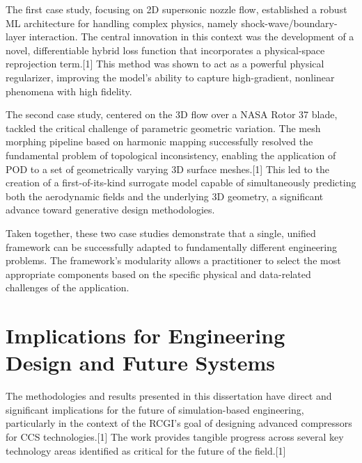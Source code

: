 \documentclass[12pt, a4paper]{report}
\begin{document}
The first case study, focusing on 2D supersonic nozzle flow, established a robust ML architecture for handling complex physics, namely shock-wave/boundary-layer interaction. The central innovation in this context was the development of a novel, differentiable hybrid loss function that incorporates a physical-space reprojection term.[1] This method was shown to act as a powerful physical regularizer, improving the model's ability to capture high-gradient, nonlinear phenomena with high fidelity.

The second case study, centered on the 3D flow over a NASA Rotor 37 blade, tackled the critical challenge of parametric geometric variation. The mesh morphing pipeline based on harmonic mapping successfully resolved the fundamental problem of topological inconsistency, enabling the application of POD to a set of geometrically varying 3D surface meshes.[1] This led to the creation of a first-of-its-kind surrogate model capable of simultaneously predicting both the aerodynamic fields and the underlying 3D geometry, a significant advance toward generative design methodologies.

Taken together, these two case studies demonstrate that a single, unified framework can be successfully adapted to fundamentally different engineering problems. The framework's modularity allows a practitioner to select the most appropriate components based on the specific physical and data-related challenges of the application.

\section{Implications for Engineering Design and Future Systems}

The methodologies and results presented in this dissertation have direct and significant implications for the future of simulation-based engineering, particularly in the context of the RCGI's goal of designing advanced compressors for CCS technologies.[1] The work provides tangible progress across several key technology areas identified as critical for the future of the field.[1]
\end{document}
